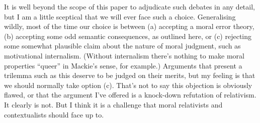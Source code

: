 It is well beyond the scope of this paper to adjudicate such debates in any detail, but I am a little sceptical that we will ever face such a choice. Generalising wildly, most of the time our choice is between (a) accepting a moral error theory, (b) accepting some odd semantic consequences, as outlined here, or (c) rejecting some somewhat plausible claim about the nature of moral judgment, such as motivational internalism. (Without internalism there's nothing to make moral properties ``queer'' in Mackie's sense, for example.) Arguments that present a trilemma such as this deserve to be judged on their merits, but my feeling is that we should normally take option (c). That's not to say this objection is obviously flawed, or that the argument I've offered is a knock-down refutation of relativism. It clearly is not. But I think it is a challenge that moral relativists and contextualists should face up to.

\renewcommand{\labelenumi}{\arabic{enumi}.}
